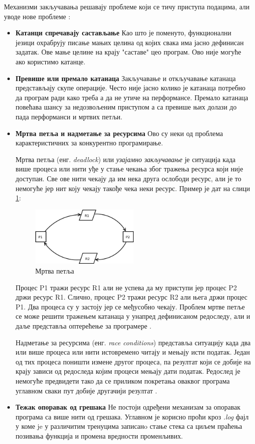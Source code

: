 \documentclass[12pt,oneside]{memoir}
\begin{document}
Механизми закључавања решавају проблеме који се тичу приступа подацима, али уводе нове проблеме \cite{progInScala3}:
\begin{itemize}
\item \textbf{Катанци спречавају састављање} Као што је поменуто, функционални језици охрабрују писање мањих целина од којих свака има јасно дефинисан задатак. Ове мање целине на крају "саставе" цео програм. Ово није могуће ако користимо катанце.
\item \textbf{Превише или премало катанаца} Закључавање и откључавање катанаца представљају скупе операције. Често није јасно колико је катанаца потребно да програм ради како треба а да не утиче на перформансе. Премало катанаца повећава шансу за недозвољеним приступом а са превише њих долази до пада перформанси и мртвих петљи.
\item \textbf{Мртва петља и надметање за ресурсима} Ово су неки од проблема карактеристичних за конкурентно програмирање.

Мртва петља (енг. \textit{deadlock}) или \textit{узајамно закључавање} је ситуација када више процеса или нити уђе у стање чекања због тражења ресурса који није доступан. Све ове нити чекају да им нека друга ослободи ресурс, али је то немогуће јер нит коју чекају такође чека неки ресурс. Пример је дат на слици \ref{fig:deadlock}:
\begin{figure}[!ht]
  \centering
  \includegraphics[width=0.5\textwidth]{deadlock.png}
  \caption{Мртва петља}
  \label{fig:deadlock}
\end{figure}
Процес P1 тражи ресурс R1 али не успева да му приступи јер процес P2 држи ресурс R1. Слично, процес P2 тражи ресурс R2 али њега држи процес P1. Два процеса су у застоју јер се међусобно чекају. Проблем мртве петље се може решити тражењем катанаца у унапред дефинисаном редоследу, али и даље представља оптерећење за програмере \cite{microsoftRaceC}.

Надметање за ресурсима (енг. \textit{race conditions}) представља ситуацију када два или више процеса или нити истовремено читају и мењају исти податак. Један од тих процеса поништи измене другог процеса, па резултат који се добије на крају зависи од редоследа којим процеси мењају дати податак. Редослед је немогуће предвидети тако да се приликом покретања оваквог програма углавном сваки пут добије другачији резултат \cite{microsoftRaceC}.

\item \textbf{Тежак опоравак од грешака} Не постоји одређени механизам за опоравак програма са више нити од грешака. Углавном је корисно проћи кроз \textit{.log} фајл у коме je у различитим тренуцима записанo стање стека са циљем праћења позивања функција и промена вредности променљивих.
\end{itemize}
\end{document}

